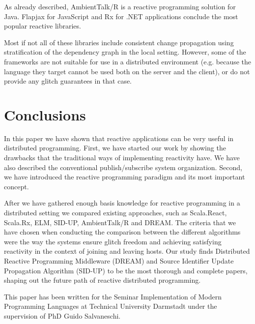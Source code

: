\documentclass{sigplanconf}
\begin{document}
As already described, AmbientTalk/R is a reactive programming solution for Java. Flapjax \cite{javascript} for JavaScript and Rx \cite{netrx} for .NET applications conclude the most popular reactive libraries.

Most if not all of these libraries include consistent change propagation using  stratification of the dependency graph in the local setting. However, some of the frameworks are not suitable for use in a distributed environment (e.g. because the language they target cannot be used both on the server and the client), or do not provide any glitch guarantees in that case. 

\section{Conclusions}
In this paper we have shown that reactive applications can be very useful in distributed programming. First, we have started our work by showing the drawbacks that the traditional ways of implementing reactivity have. We have also described the conventional publish/subscribe system organization. Second, we have introduced the reactive programming paradigm and its most important concept.

After we have gathered enough basis knowledge for reactive programming in a distributed setting we compared existing approaches, such as Scala.React, Scala.Rx, ELM, SID-UP, AmbientTalk/R and DREAM. The criteria that we have chosen when conducting the comparison between the different algorithms were the way the systems ensure glitch freedom and achieving satisfying reactivity in the context of joining and leaving hosts. Our study finds Distributed Reactive Programming Middleware (DREAM) and Source Identifier Update Propagation Algorithm (SID-UP) to be the most  thorough and complete papers, shaping out the future path of reactive distributed programming.



\acks

This paper has been written for the Seminar Implementation of Modern Programming Languages at Technical University Darmstadt under the supervision of PhD Guido Salvaneschi.

\end{document}

